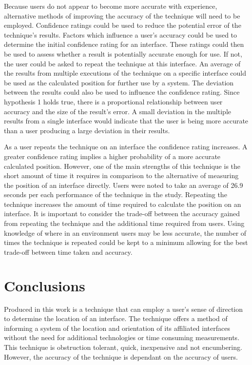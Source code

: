 \documentclass{bmcart}
\begin{document}
Because users do not appear to become more accurate with experience, alternative methods of improving the accuracy of the technique will need to be employed.
Confidence ratings could be used to reduce the potential error of the technique's results.
Factors which influence a user's accuracy could be used to determine the initial confidence rating for an interface.
These ratings could then be used to assess whether a result is potentially accurate enough for use.
If not, the user could be asked to repeat the technique at this interface.
An average of the results from multiple executions of the technique on a specific interface could be used as the calculated position for further use by a system.
The deviation between the results could also be used to influence the confidence rating.
Since hypothesis 1 holds true, there is a proportional relationship between user accuracy and the size of the result's error.
A small deviation in the multiple results from a single interface would indicate that the user is being more accurate than a user producing a large deviation in their results.

As a user repeats the technique on an interface the confidence rating increases.
A greater confidence rating implies a higher probability of a more accurate calculated position.
However, one of the main strengths of this technique is the short amount of time it requires in comparison to the alternative of measuring the position of an interface directly.
Users were noted to take an average of 26.9 seconds per each performance of the technique in the study.
Repeating the technique increases the amount of time required to calculate the position on an interface.
It is important to consider the trade-off between the accuracy gained from repeating the technique and the additional time required from users.
Using knowledge of where in an environment users may be less accurate, the number of times the technique is repeated could be kept to a minimum allowing for the best trade-off between time taken and accuracy.


\section*{Conclusions}\label{sec:conclusion}

Produced in this work is a technique that can employ a user's sense of direction to determine the location of an interface.
The technique offers a method of informing a system of the location and orientation of its affiliated interfaces without the need for additional technologies or time consuming measurements. 
This technique is obstruction tolerant, quick, inexpensive and not encumbering.
However, the accuracy of the technique is dependant on the accuracy of users.
\end{document}
